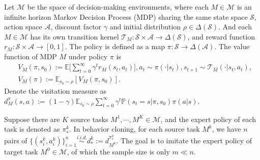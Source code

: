 \documentclass{article}
\numberwithin{equation}{section}
\newcommand{\E}{\mathbb{E}}
\theoremstyle{definition}
\renewcommand{\P}{\mathbb{P}}
\begin{document}
Let $\mathcal{M}$ be the space of decision-making environments, where each $M\in\mathcal{M}$ is an infinite horizon Markov Decision Process (MDP) sharing the same state space $\mathcal{S}$, action space $\mathcal{A}$, discount factor $\gamma$ and initial distribution $\rho\in\Delta(\mathcal{S})$.
And each $M\in\mathcal{M}$ has its own transition kernel $\mathcal{T}_M:\mathcal{S}\times\mathcal{A}\to\Delta(\mathcal{S})$, and reward function $r_M:\mathcal{S}\times\mathcal{A}\to[0,1]$.
The policy is defined as a map $\pi:\mathcal{S}\to\Delta(\mathcal{A})$. 
The value function of MDP $M$ under policy $\pi$ is 
\begin{equation}
    \begin{aligned}
        &V_M(\pi,s_0):= \E\Big[\sum_{t=0}^\infty \gamma^tr_M(s_t,a_t)\Big], a_t\sim\pi(\cdot|s_t),
        s_{t+1}\sim\mathcal{T}_M(\cdot|s_t,a_t),\\  
        &V_M(\pi):=\E_{s_0\sim\rho}[V_M(\pi,s_0)].
    \end{aligned}
\end{equation}
Denote the visitation measure as $d_M^\pi(s,a):=(1-\gamma)\E_{s_0\sim\rho}\sum_{t=0}^\infty \gamma^t\P(s_t=s|\pi,s_0)\pi(a|s)$.

Suppose there are $K$ source tasks $M^1,\cdots,M^K\in\mathcal{M}$, and the expert policy of each task is denoted as $\pi_*^k$.
In behavior cloning, for each source task $M^k$, we have $n$ pairs of $\{(s_i^k,a_i^k)\}_{i=1}^n \overset{\textit{i.i.d.}}{\sim} d^k_*:=d_{M^k}^{\pi_*^k}$. 
The goal is to imitate the expert policy of target task $M^0\in\mathcal{M}$, of which the sample size is only $m\ll n$.   
\end{document}
